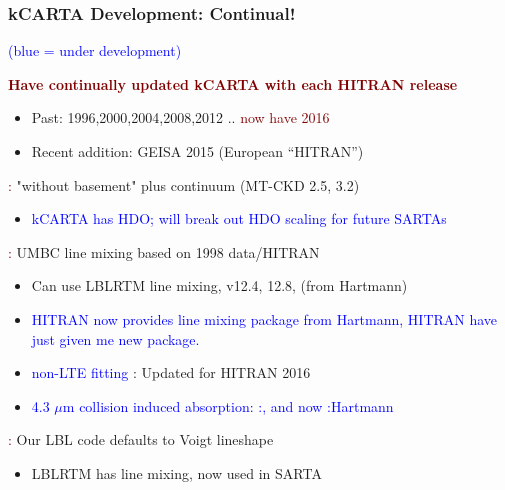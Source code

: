 \documentclass[10pt,t]{beamer}
\begin{document}
\begin{frame}
  \frametitle{kCARTA Development: Continual!}
  \vspace{-0.15in} \small\textcolor{blue}{(blue = under development)}

  {\bf \textcolor{maroon}{Have continually updated kCARTA with each HITRAN
      release} } \vspace{-0.1in}

  \begin{small}
    \begin{itemize} \itemsep0.25pt
    \item Past: 1996,2000,2004,2008,2012 .. \textcolor{maroon}{now have
        2016}
    \item Recent addition: GEISA 2015 (European ``HITRAN'')

    \end{itemize}
  \end{small}

  \textcolor{maroon}{\water : }"without basement" plus continuum (MT-CKD
  2.5, 3.2) \vspace{-0.1in}
  \begin{small}
    \begin{itemize} \itemsep0.25pt
    \item \textcolor{blue}{kCARTA has HDO; will break out HDO scaling for
        future SARTAs}
    \end{itemize}
  \end{small}

  \textcolor{maroon}{\cd :} UMBC line mixing based on 1998 data/HITRAN
  \vspace{-0.1in}
  \begin{small}
    \begin{itemize} \itemsep0.25pt
    \item Can use LBLRTM \cd line mixing, v12.4, 12.8, (from Hartmann)
    \item \textcolor{blue}{HITRAN now provides line mixing package from
        Hartmann, HITRAN have just given me new package.}
    \item \textcolor{blue}{non-LTE fitting} : Updated for HITRAN 2016
    \item \textcolor{blue}{4.3 $\mu$m collision induced absorption:
        \cd:\nitrogen, and now \cd:\water Hartmann}
    \end{itemize}
  \end{small}

  \textcolor{maroon}{\methane : } Our LBL code defaults to Voigt lineshape
  \vspace{-0.1in}
  \begin{small}
    \begin{itemize} \itemsep0.25pt
    \item LBLRTM has \methane line mixing, now used in SARTA
    \end{itemize}
  \end{small}

\end{frame}
\end{document}
